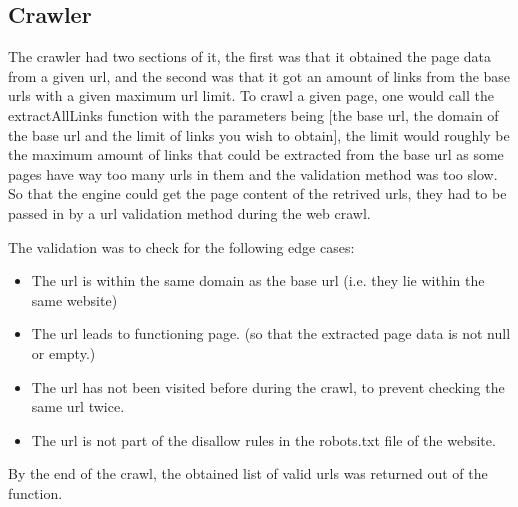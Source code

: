 \subsection{Crawler}

The crawler had two sections of it, the first was that it obtained the page data from a given url, and the second was that it got an amount of links from the base urls with a given maximum url limit.
To crawl a given page, one would call the extractAllLinks function with the parameters being [the base url, the domain of the base url and the limit of links you wish to obtain], 
the limit would roughly be the maximum amount of links that could be extracted from the base url as some pages have way too many urls in them and the validation method was too slow. \\

So that the engine could get the page content of the retrived urls, they had to be passed in by a url validation method during the web crawl.

The validation was to check for the following edge cases:
\begin{itemize}
    \item The url is within the same domain as the base url (i.e. they lie within the same website)
    \item The url leads to functioning page. (so that the extracted page data is not null or empty.)
    \item The url has not been visited before during the crawl, to prevent checking the same url twice.
    \item The url is not part of the disallow rules in the robots.txt file of the website.
\end{itemize}

By the end of the crawl, the obtained list of valid urls was returned out of the function.